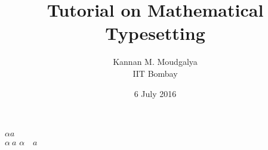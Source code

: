 \documentclass[12pt,a5paper]{article}
\title{Tutorial on Mathematical Typesetting}
\author{Kannan M. Moudgalya \\ IIT Bombay}
\date{6 July 2016}
\begin{document}
\maketitle
$\alpha a$ \\
$\alpha \ a$
$\alpha \quad a$
\end{document}
